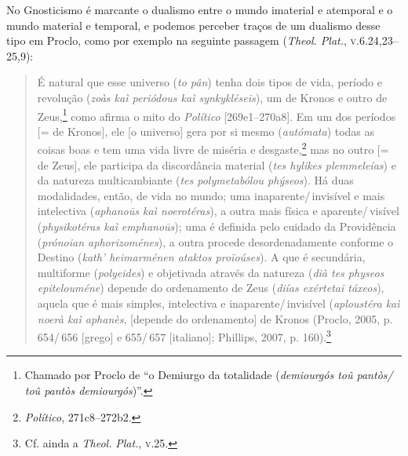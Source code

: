 No Gnosticismo é marcante o dualismo entre o mundo imaterial
e atemporal e o mundo material e temporal, e podemos perceber
traços de um dualismo desse tipo em Proclo, como por exemplo na
seguinte passagem (\emph{Theol. Plat.}, \textsc{v}.6.24,23--25,9):

\begin{quote}
É natural que esse universo (\emph{to pân}) tenha dois
tipos de vida, período e revolução
(\emph{z}\emph{o}\emph{às kaì periódous kaì
synkyklés}\emph{e}\emph{is}), um de Kronos e outro de
Zeus,\footnote{ Chamado por Proclo de “o Demiurgo da totalidade
(\emph{demiourgós toû pantòs/ toû pantòs demiourgós})”.} como
afirma o mito do \emph{Político} [269e1--270a8]. Em um dos
períodos [= de Kronos], ele [o universo] gera por si mesmo
(\emph{autómata}) todas as coisas boas e tem uma vida livre de
miséria e desgaste,\footnote{ \emph{Político}, 271c8--272b2.}
mas no outro [= de Zeus], ele participa da discordância material
(\emph{tes hylikes
plemm}\emph{e}\emph{l}\emph{e}\emph{ías}) e da natureza
multicambiante (\emph{tes polymetabólou
phýse}\emph{o}\emph{s}). Há duas modalidades, então, de vida
no mundo; uma inaparente/\,invisível e mais intelectiva
(\emph{aphanoūs kaì
no}\emph{e}\emph{r}\emph{o}\emph{t}\emph{é}\emph{ras}),
a outra mais física e aparente/\,visível
(\emph{physik}\emph{o}\emph{t}\emph{é}\emph{ras kaì}
\emph{e}\emph{mphanoūs}); uma é definida pelo cuidado da
Providência (\emph{prónoian aphorizom}\emph{é}\emph{nes}),
a outra procede desordenadamente conforme o Destino
(\emph{kath' h}\emph{e}\emph{imarm}\emph{é}\emph{nen
atakt}\emph{o}\emph{s proïoúses}). A que é secundária,
multiforme (\emph{poly}\emph{e}\emph{ides}) e objetivada
através da natureza (\emph{dià tes phys}\emph{eo}\emph{s}
\emph{e}\emph{pit}\emph{e}\emph{loum}\emph{é}\emph{ne})
depende do ordenamento de Zeus (\emph{diías exértetai
táx}\emph{eo}\emph{s}), aquela que é mais simples,
intelectiva e inaparente/\,invisível
(\emph{aploust}\emph{é}\emph{ra kaì
no}\emph{e}\emph{rà kaì aphanès}, [depende do ordenamento]
de Kronos (Proclo, 2005, p. 654/\,656 [grego] e 655/\,657
[italiano]; Phillips, 2007, p. 160).\footnote{ Cf. ainda a
\emph{Theol.} \emph{Plat.}, \textsc{v}.25.}
\end{quote}

